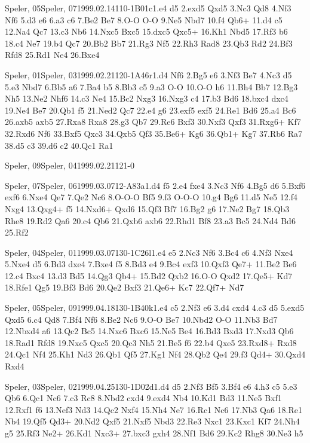 \documentclass[twocolumn,a4paper,10pt]{report}
\begin{document}
\begin{chessgame}{Speler, 05}{Speler, 07}{1999.02.14}{11}{0-1}{B01c}{1.e4 d5 2.exd5 Qxd5 3.Nc3 Qd8 4.Nf3 Nf6 5.d3 e6 6.a3 c6 7.Be2 Be7 8.O-O O-O 9.Ne5 Nbd7 10.f4 Qb6+ 11.d4 c5 12.Na4 Qc7 13.c3 Nb6 14.Nxc5 Bxc5 15.dxc5 Qxc5+ 16.Kh1 Nbd5 17.Rf3 b6 18.c4 Ne7 19.b4 Qc7 20.Bb2 Bb7 21.Rg3 Nf5 22.Rh3 Rad8 23.Qb3 Rd2 24.Bf3 Rfd8 25.Rd1 Ne4 26.Bxe4}\end{chessgame}
\begin{chessgame}{Speler, 01}{Speler, 03}{1999.02.21}{12}{0-1}{A46r}{1.d4 Nf6 2.Bg5 e6 3.Nf3 Be7 4.Nc3 d5 5.e3 Nbd7 6.Bb5 a6 7.Ba4 b5 8.Bb3 c5 9.a3 O-O 10.O-O h6 11.Bh4 Bb7 12.Bg3 Nh5 13.Ne2 Nhf6 14.c3 Ne4 15.Bc2 Nxg3 16.Nxg3 c4 17.b3 Bd6 18.bxc4 dxc4 19.Ne4 Be7 20.Qb1 f5 21.Ned2 Qc7 22.e4 g6 23.exf5 exf5 24.Re1 Bd6 25.a4 Bc6 26.axb5 axb5 27.Rxa8 Rxa8 28.g3 Qb7 29.Re6 Bxf3 30.Nxf3 Qxf3 31.Rxg6+ Kf7 32.Rxd6 Nf6 33.Bxf5 Qxc3 34.Qxb5 Qf3 35.Be6+ Kg6 36.Qb1+ Kg7 37.Rb6 Ra7 38.d5 c3 39.d6 c2 40.Qc1 Ra1}\end{chessgame}
\begin{chessempty}{Speler, 09}{Speler, 04}{1999.02.21}{12}{1-0}{}\end{chessempty}
\begin{chessgame}{Speler, 07}{Speler, 06}{1999.03.07}{12}{\textonehalf-\textonehalf}{A83a}{1.d4 f5 2.e4 fxe4 3.Nc3 Nf6 4.Bg5 d6 5.Bxf6 exf6 6.Nxe4 Qe7 7.Qe2 Nc6 8.O-O-O Bf5 9.f3 O-O-O 10.g4 Bg6 11.d5 Ne5 12.f4 Nxg4 13.Qxg4+ f5 14.Nxd6+ Qxd6 15.Qf3 Bf7 16.Bg2 g6 17.Ne2 Bg7 18.Qb3 Rhe8 19.Rd2 Qa6 20.c4 Qb6 21.Qxb6 axb6 22.Rhd1 Bf8 23.a3 Bc5 24.Nd4 Bd6 25.Rf2}\end{chessgame}
\begin{chessgame}{Speler, 04}{Speler, 01}{1999.03.07}{13}{0-1}{C26l}{1.e4 e5 2.Nc3 Nf6 3.Bc4 c6 4.Nf3 Nxe4 5.Nxe4 d5 6.Bd3 dxe4 7.Bxe4 f5 8.Bd3 e4 9.Bc4 exf3 10.Qxf3 Qe7+ 11.Be2 Be6 12.c4 Bxc4 13.d3 Bd5 14.Qg3 Qb4+ 15.Bd2 Qxb2 16.O-O Qxd2 17.Qe5+ Kd7 18.Rfe1 Qg5 19.Bf3 Bd6 20.Qe2 Bxf3 21.Qe6+ Kc7 22.Qf7+ Nd7}\end{chessgame}
\begin{chessgame}{Speler, 05}{Speler, 09}{1999.04.18}{13}{0-1}{B40k}{1.e4 c5 2.Nf3 e6 3.d4 cxd4 4.c3 d5 5.exd5 Qxd5 6.c4 Qd8 7.Bf4 Nf6 8.Be2 Nc6 9.O-O Be7 10.Nbd2 O-O 11.Nb3 Bd7 12.Nbxd4 a6 13.Qc2 Bc5 14.Nxc6 Bxc6 15.Ne5 Be4 16.Bd3 Bxd3 17.Nxd3 Qb6 18.Rad1 Rfd8 19.Nxc5 Qxc5 20.Qc3 Nh5 21.Be5 f6 22.b4 Qxe5 23.Rxd8+ Rxd8 24.Qc1 Nf4 25.Kh1 Nd3 26.Qb1 Qf5 27.Kg1 Nf4 28.Qb2 Qe4 29.f3 Qd4+ 30.Qxd4 Rxd4}\end{chessgame}
\begin{chessgame}{Speler, 03}{Speler, 02}{1999.04.25}{13}{0-1}{D02d}{1.d4 d5 2.Nf3 Bf5 3.Bf4 e6 4.h3 c5 5.e3 Qb6 6.Qc1 Nc6 7.c3 Rc8 8.Nbd2 cxd4 9.exd4 Nb4 10.Kd1 Bd3 11.Ne5 Bxf1 12.Rxf1 f6 13.Nef3 Nd3 14.Qc2 Nxf4 15.Nh4 Ne7 16.Rc1 Nc6 17.Nb3 Qa6 18.Re1 Nb4 19.Qf5 Qd3+ 20.Nd2 Qxf5 21.Nxf5 Nbd3 22.Re3 Nxc1 23.Kxc1 Kf7 24.Nh4 g5 25.Rf3 Ne2+ 26.Kd1 Nxc3+ 27.bxc3 gxh4 28.Nf1 Bd6 29.Kc2 Rhg8 30.Ne3 h5}\end{chessgame}
\end{document}
